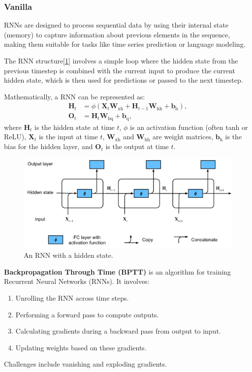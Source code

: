 \documentclass[10pt,twocolumn,letterpaper]{article}
\begin{document}
\subsubsection{Vanilla}
\label{sec:vani}
RNNs are designed to process sequential data by using their internal state (memory) to capture information about previous elements in the sequence, making them suitable for tasks like time series prediction or language modeling.

The RNN structure[\ref{fig:rnn}] involves a simple loop where the hidden state from the previous timestep is combined with the current input to produce the current hidden state, which is then used for predictions or passed to the next timestep.

Mathematically, a RNN can be represented as:
\begin{align*}
	\mathbf{H}_t &= \phi(\mathbf{X}_t \mathbf{W}_{\textrm{xh}} + \mathbf{H}_{t-1} \mathbf{W}_{\textrm{hh}}  + \mathbf{b}_\textrm{h}), \\
	\mathbf{O}_t &= \mathbf{H}_t \mathbf{W}_{\textrm{hq}} + \mathbf{b}_\textrm{q},
\end{align*}
where \( \mathbf{H}_t \) is the hidden state at time \( t \), \( \phi \) is an activation function (often tanh or ReLU), \( \mathbf{X}_t \) is the input at time \( t \), \( \mathbf{W}_{\textrm{xh}} \) and \( \mathbf{W}_{\textrm{hh}} \) are weight matrices, \( \mathbf{b}_\textrm{h} \) is the bias for the hidden layer, and \( \mathbf{O}_t \) is the output at time \( t \).
\begin{figure}[h]
	\centering
	\includegraphics[width=\columnwidth]{rnn}
	\caption{An RNN with a hidden state\cite{zhang2023dive}.}
	\label{fig:rnn}
\end{figure}
\textbf{Backpropagation Through Time (BPTT)} is an algorithm for training Recurrent Neural Networks (RNNs). It involves:
\begin{enumerate}
    \item Unrolling the RNN across time steps.
    \item Performing a forward pass to compute outputs.
    \item Calculating gradients during a backward pass from output to input.
    \item Updating weights based on these gradients.
\end{enumerate}
Challenges include vanishing and exploding gradients\cite{rumelhart1986learning}.
\end{document}
